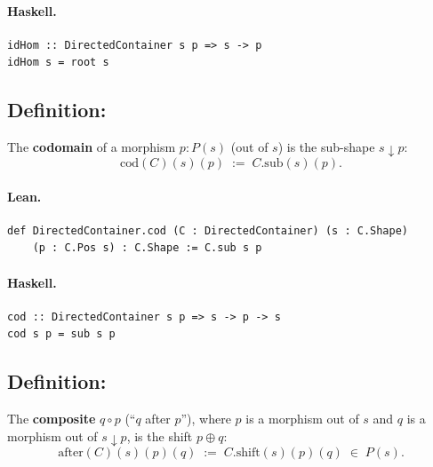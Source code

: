 \documentclass[11pt,a4paper]{article}
\begin{document}
\paragraph{Haskell.}
\begin{lstlisting}[style=haskell]
idHom :: DirectedContainer s p => s -> p
idHom s = root s
\end{lstlisting}


\subsection{Definition: }

\begin{defn}
The \textbf{codomain} of a morphism $p : P(s)$ (out of $s$) is the sub-shape
$s \downarrow p$:
\[
  \mathrm{cod}(C)(s)(p) \;:=\; C.\mathrm{sub}(s)(p).
\]
\end{defn}

\paragraph{Lean.}
\begin{lstlisting}[style=lean]
def DirectedContainer.cod (C : DirectedContainer) (s : C.Shape)
    (p : C.Pos s) : C.Shape := C.sub s p
\end{lstlisting}

\paragraph{Haskell.}
\begin{lstlisting}[style=haskell]
cod :: DirectedContainer s p => s -> p -> s
cod s p = sub s p
\end{lstlisting}


\subsection{Definition: }

\begin{defn}
The \textbf{composite} $q \circ p$ (``$q$ after $p$''), where $p$ is a
morphism out of $s$ and $q$ is a morphism out of $s \downarrow p$, is the
shift $p \oplus q$:
\[
  \mathrm{after}(C)(s)(p)(q) \;:=\; C.\mathrm{shift}(s)(p)(q) \;\in\; P(s).
\]
\end{defn}
\end{document}
